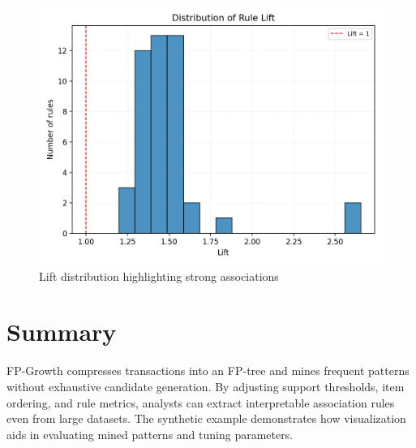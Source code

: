 ﻿\documentclass[12pt]{article}
\begin{document}
\begin{figure}[H]
  \centering
  \includegraphics[width=0.78\linewidth]{fpgrowth_lift_distribution.png}
  \caption{Lift distribution highlighting strong associations}
  \label{fig:fpgrowth_lift_distribution}
\end{figure}

\FloatBarrier
\section{Summary}
FP-Growth compresses transactions into an FP-tree and mines frequent patterns without exhaustive candidate generation. By adjusting support thresholds, item ordering, and rule metrics, analysts can extract interpretable association rules even from large datasets. The synthetic example demonstrates how visualization aids in evaluating mined patterns and tuning parameters.
\end{document}
